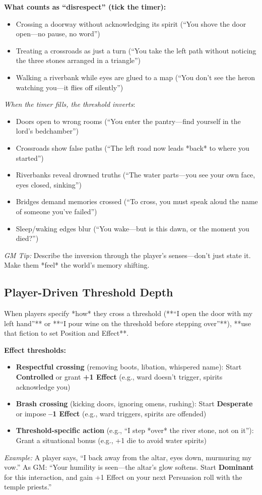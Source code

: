 \textbf{What counts as ``disrespect'' (tick the timer):}
\begin{itemize}
  \item Crossing a doorway without acknowledging its spirit (``You shove the door open---no pause, no word'') 
  \item Treating a crossroads as just a turn (``You take the left path without noticing the three stones arranged in a triangle'') 
  \item Walking a riverbank while eyes are glued to a map (``You don't see the heron watching you---it flies off silently'') 
\end{itemize}
\textit{When the timer fills, the threshold inverts}: 
\begin{itemize}
  \item Doors open to wrong rooms (``You enter the pantry---find yourself in the lord's bedchamber'') 
  \item Crossroads show false paths (``The left road now leads *back* to where you started'') 
  \item Riverbanks reveal drowned truths (``The water parts---you see your own face, eyes closed, sinking'') 
  \item Bridges demand memories crossed (``To cross, you must speak aloud the name of someone you've failed'') 
  \item Sleep/waking edges blur (``You wake---but is this dawn, or the moment you died?'') 
\end{itemize}
\textit{GM Tip:} Describe the inversion through the player's senses---don't just state it. Make them *feel* the world's memory shifting.

\subsection*{Player-Driven Threshold Depth}
When players specify *how* they cross a threshold (**``I open the door with my left hand''** or **``I pour wine on the threshold before stepping over''**), **use that fiction to set Position and Effect**. 

\textbf{Effect thresholds:}
\begin{itemize}
  \item \textbf{Respectful crossing} (removing boots, libation, whispered name): Start \textbf{Controlled} or grant \textbf{+1 Effect} (e.g., ward doesn't trigger, spirits acknowledge you) 
  \item \textbf{Brash crossing} (kicking doors, ignoring omens, rushing): Start \textbf{Desperate} or impose \textbf{--1 Effect} (e.g., ward triggers, spirits are offended) 
  \item \textbf{Threshold-specific action} (e.g., ``I step *over* the river stone, not on it''): Grant a situational bonus (e.g., +1 die to avoid water spirits) 
\end{itemize}
\textit{Example:} A player says, ``I back away from the altar, eyes down, murmuring my vow.'' As GM: ``Your humility is seen---the altar's glow softens. Start \textbf{Dominant} for this interaction, and gain +1 Effect on your next Persuasion roll with the temple priests.''

